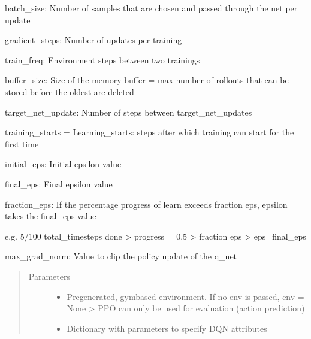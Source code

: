 \documentclass[letterpaper,10pt,english]{sphinxmanual}
\begin{document}
\begin{fulllineitems}
\begin{fulllineitems}
\label{\detokenize{agents.reinforcement_learning:agents.reinforcement_learning.dqn.DQN.__init__}}
\begin{DUlineblock}{0em}
\item[] batch\_size: Number of samples that are chosen and passed through the net per update
\item[] gradient\_steps: Number of updates per training
\item[] train\_freq: Environment steps between two trainings
\item[] buffer\_size: Size of the memory buffer = max number of rollouts that can be stored before the oldest are deleted
\item[] target\_net\_update: Number of steps between target\_net\_updates
\item[] training\_starts = Learning\_starts: steps after which training can start for the first time
\item[] initial\_eps: Initial epsilon value
\item[] final\_eps: Final epsilon value
\item[] fraction\_eps: If the percentage progress of learn exceeds fraction eps, epsilon takes the final\_eps value
\item[] e.g. 5/100 total\_timesteps done \sphinxhyphen{}\textgreater{} progress = 0.5 \textgreater{} fraction eps \sphinxhyphen{}\textgreater{} eps=final\_eps
\item[] max\_grad\_norm: Value to clip the policy update of the q\_net
\end{DUlineblock}
\begin{quote}\begin{description}
\item[{Parameters}] \leavevmode\begin{itemize}
\item {} 
\sphinxAtStartPar
{} \textendash{} Pregenerated, gymbased environment. If no env is passed, env = None \sphinxhyphen{}\textgreater{} PPO can only be used
for evaluation (action prediction)

\item {} 
\sphinxAtStartPar
{} \textendash{} Dictionary with parameters to specify DQN attributes


\end{itemize}
\end{description}
\end{quote}
\end{fulllineitems}
\end{fulllineitems}
\end{document}

